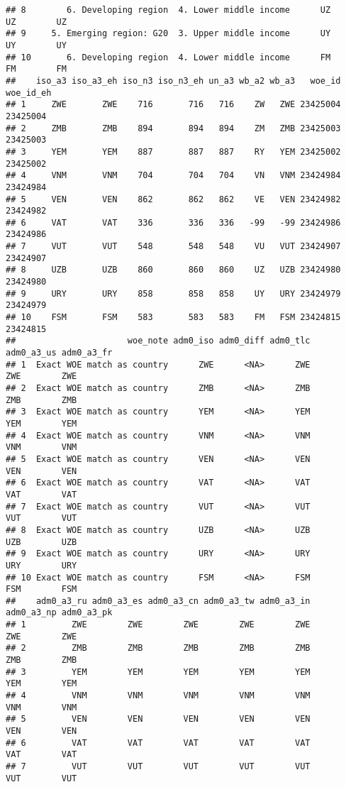 \documentclass[
]{article}
\begin{document}
\begin{verbatim}
## 8        6. Developing region  4. Lower middle income      UZ     UZ        UZ
## 9     5. Emerging region: G20  3. Upper middle income      UY     UY        UY
## 10       6. Developing region  4. Lower middle income      FM     FM        FM
##    iso_a3 iso_a3_eh iso_n3 iso_n3_eh un_a3 wb_a2 wb_a3   woe_id woe_id_eh
## 1     ZWE       ZWE    716       716   716    ZW   ZWE 23425004  23425004
## 2     ZMB       ZMB    894       894   894    ZM   ZMB 23425003  23425003
## 3     YEM       YEM    887       887   887    RY   YEM 23425002  23425002
## 4     VNM       VNM    704       704   704    VN   VNM 23424984  23424984
## 5     VEN       VEN    862       862   862    VE   VEN 23424982  23424982
## 6     VAT       VAT    336       336   336   -99   -99 23424986  23424986
## 7     VUT       VUT    548       548   548    VU   VUT 23424907  23424907
## 8     UZB       UZB    860       860   860    UZ   UZB 23424980  23424980
## 9     URY       URY    858       858   858    UY   URY 23424979  23424979
## 10    FSM       FSM    583       583   583    FM   FSM 23424815  23424815
##                      woe_note adm0_iso adm0_diff adm0_tlc adm0_a3_us adm0_a3_fr
## 1  Exact WOE match as country      ZWE      <NA>      ZWE        ZWE        ZWE
## 2  Exact WOE match as country      ZMB      <NA>      ZMB        ZMB        ZMB
## 3  Exact WOE match as country      YEM      <NA>      YEM        YEM        YEM
## 4  Exact WOE match as country      VNM      <NA>      VNM        VNM        VNM
## 5  Exact WOE match as country      VEN      <NA>      VEN        VEN        VEN
## 6  Exact WOE match as country      VAT      <NA>      VAT        VAT        VAT
## 7  Exact WOE match as country      VUT      <NA>      VUT        VUT        VUT
## 8  Exact WOE match as country      UZB      <NA>      UZB        UZB        UZB
## 9  Exact WOE match as country      URY      <NA>      URY        URY        URY
## 10 Exact WOE match as country      FSM      <NA>      FSM        FSM        FSM
##    adm0_a3_ru adm0_a3_es adm0_a3_cn adm0_a3_tw adm0_a3_in adm0_a3_np adm0_a3_pk
## 1         ZWE        ZWE        ZWE        ZWE        ZWE        ZWE        ZWE
## 2         ZMB        ZMB        ZMB        ZMB        ZMB        ZMB        ZMB
## 3         YEM        YEM        YEM        YEM        YEM        YEM        YEM
## 4         VNM        VNM        VNM        VNM        VNM        VNM        VNM
## 5         VEN        VEN        VEN        VEN        VEN        VEN        VEN
## 6         VAT        VAT        VAT        VAT        VAT        VAT        VAT
## 7         VUT        VUT        VUT        VUT        VUT        VUT        VUT

\end{verbatim}
\end{document}
